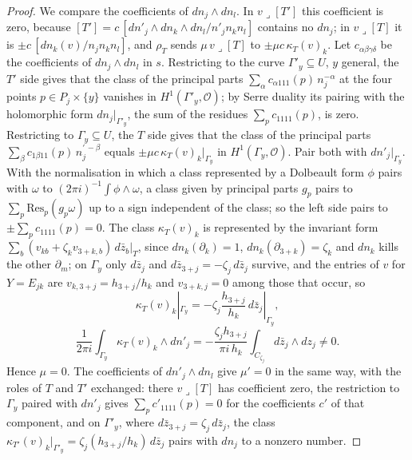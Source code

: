 \begin{proof}
We compare the coefficients of $dn_{j}\wedge dn_{l}$. In $v\lrcorner[T']$ this coefficient is zero, because $[T']=c\,[dn'_{j}\wedge dn_{k}\wedge dn_{l}/n'_{j}n_{k}n_{l}]$ contains no $dn_{j}$; in $v\lrcorner[T]$ it is $\pm c\,[dn_{k}(v)/n_{j}n_{k}n_{l}]$, and $\rho_{T}$ sends $\mu\,v\lrcorner[T]$ to $\pm\mu c\,\kappa_{T}(v)_{k}$. Let $c_{\alpha\beta\gamma\delta}$ be the coefficients of $dn_{j}\wedge dn_{l}$ in $s$. Restricting to the curve $\Gamma'_{y}\subseteq U$, $y$ general, the $T'$ side gives that the class of the principal parts $\sum_{\alpha}c_{\alpha111}(p)\,n_{j}^{-\alpha}$ at the four points $p\in P_{j}\times\{y\}$ vanishes in $H^{1}(\Gamma'_{y},\mathcal{O})$; by Serre duality its pairing with the holomorphic form $dn_{j}|_{\Gamma'_{y}}$, the sum of the residues $\sum_{p}c_{1111}(p)$, is zero. Restricting to $\Gamma_{y}\subseteq U$, the $T$ side gives that the class of the principal parts $\sum_{\beta}c_{1\beta11}(p)\,n_{j}^{\prime\,-\beta}$ equals $\pm\mu c\,\kappa_{T}(v)_{k}|_{\Gamma_{y}}$ in $H^{1}(\Gamma_{y},\mathcal{O})$. Pair both with $dn'_{j}|_{\Gamma_{y}}$. With the normalisation in which a class represented by a Dolbeault form $\phi$ pairs with $\omega$ to $(2\pi i)^{-1}\int\phi\wedge\omega$, a class given by principal parts $g_{p}$ pairs to $\sum_{p}\mathrm{Res}_{p}(g_{p}\omega)$ up to a sign independent of the class; so the left side pairs to $\pm\sum_{p}c_{1111}(p)=0$. The class $\kappa_{T}(v)_{k}$ is represented by the invariant form $\sum_{b}(v_{kb}+\zeta_{k}v_{3+k,b})\,d\bar z_{b}|_{T}$, since $dn_{k}(\partial_{k})=1$, $dn_{k}(\partial_{3+k})=\zeta_{k}$ and $dn_{k}$ kills the other $\partial_{m}$; on $\Gamma_{y}$ only $d\bar z_{j}$ and $d\bar z_{3+j}=-\zeta_{j}\,d\bar z_{j}$ survive, and the entries of $v$ for $Y=E_{jk}$ are $v_{k,3+j}=h_{3+j}/h_{k}$ and $v_{3+k,j}=0$ among those that occur, so
\[
\kappa_{T}(v)_{k}|_{\Gamma_{y}}=-\zeta_{j}\frac{h_{3+j}}{h_{k}}\,d\bar z_{j}|_{\Gamma_{y}},
\]
\[
\frac{1}{2\pi i}\int_{\Gamma_{y}}\kappa_{T}(v)_{k}\wedge dn'_{j}=-\frac{\zeta_{j}h_{3+j}}{\pi i\,h_{k}}\int_{C_{\zeta_{j}}}d\bar z_{j}\wedge dz_{j}\ne0 .
\]
Hence $\mu=0$. The coefficients of $dn'_{j}\wedge dn_{l}$ give $\mu'=0$ in the same way, with the roles of $T$ and $T'$ exchanged: there $v\lrcorner[T]$ has coefficient zero, the restriction to $\Gamma_{y}$ paired with $dn'_{j}$ gives $\sum_{p}c'_{1111}(p)=0$ for the coefficients $c'$ of that component, and on $\Gamma'_{y}$, where $d\bar z_{3+j}=\zeta_{j}\,d\bar z_{j}$, the class $\kappa_{T'}(v)_{k}|_{\Gamma'_{y}}=\zeta_{j}(h_{3+j}/h_{k})\,d\bar z_{j}$ pairs with $dn_{j}$ to a nonzero number.
\end{proof}

